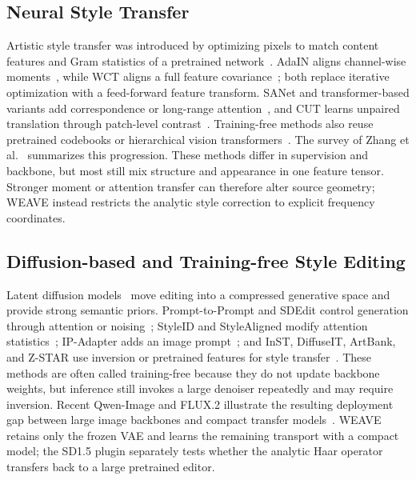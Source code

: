 \documentclass[letterpaper]{article}
\begin{document}
\subsection{Neural Style Transfer}
\label{sec:rw-nst}
Artistic style transfer was introduced by optimizing pixels to match content features and
Gram statistics of a pretrained network~\cite{gatys2015neural,gatys2016image}. AdaIN
aligns channel-wise moments~\cite{huang2017arbitrary}, while WCT aligns a full feature
covariance~\cite{li2017universal}; both replace iterative optimization with a feed-forward
feature transform. SANet and transformer-based variants add correspondence or long-range
attention~\cite{park2019sanet,deng2022stytr2,hong2023aespa,kwon2024aesfa}, and CUT learns
unpaired translation through patch-level contrast~\cite{park2020cut}. Training-free methods
also reuse pretrained codebooks or hierarchical vision transformers~\cite{gim2024cast,zhang2024s2wat}.
The survey of Zhang et al.~\cite{zhang2025survey} summarizes this progression. These methods
differ in supervision and backbone, but most still mix structure and appearance in one
feature tensor. Stronger moment or attention transfer can therefore alter source geometry;
WEAVE instead restricts the analytic style correction to explicit frequency coordinates.

\subsection{Diffusion-based and Training-free Style Editing}
\label{sec:rw-diffusion}
Latent diffusion models~\cite{rombach2022high} move editing into a compressed generative
space and provide strong semantic priors. Prompt-to-Prompt and SDEdit control generation
through attention or noising~\cite{hertz2022prompt,meng2021sdedit}; StyleID and StyleAligned
modify attention statistics~\cite{chung2024style,hertz2024style}; IP-Adapter adds an image
prompt~\cite{ye2023ipadapter}; and InST, DiffuseIT, ArtBank, and Z-STAR use inversion or
pretrained features for style transfer~\cite{zhang2023inst,kim2022diffuseit,zhang2024artbank,lu2024zstar}.
These methods are often called training-free because they do not update backbone weights,
but inference still invokes a large denoiser repeatedly and may require inversion. Recent
Qwen-Image and FLUX.2 illustrate the resulting deployment gap between large image
backbones and compact transfer models~\cite{wu2025qwenimagetechnicalreport,blackforestlabs2025flux2}.
WEAVE retains only the frozen VAE and learns the remaining transport with a compact model;
the SD1.5 plugin separately tests whether the analytic Haar operator transfers back to
a large pretrained editor.
\end{document}
